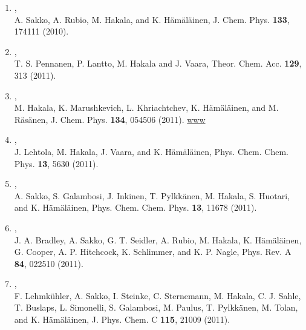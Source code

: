 \documentclass[12pt,a4]{report}
\begin{document}
\begin{enumerate}
\item{},\\ 
A. Sakko, A. Rubio, M. Hakala, and K. H{\"a}m{\"a}l{\"a}inen, J. Chem. Phys. {\bf 133}, 174111 (2010).  

\item{},\\ T. S. Pennanen, P. Lantto, M. Hakala and J. Vaara, Theor. Chem. Acc. {\bf 129}, 313 (2011). 

\item{},\\ M. Hakala, K. Marushkevich, L. Khriachtchev, K. H\"am\"al\"ainen, and M. R\"as\"anen, J. Chem. Phys. {\bf 134}, 054506 (2011). %
\href{http://scitation.aip.org/content/aip/journal/jcp/134/5/10.1063/1.3533955}{www}  


\item{},\\ J. Lehtola, M. Hakala, J. Vaara, and K. H\"am\"al\"ainen, Phys. Chem. Chem. Phys. {\bf 13}, 5630 (2011). %

\item{},\\ A. Sakko, S. Galambosi, J. Inkinen, T. Pylkk\"anen, M. Hakala, S. Huotari, and K. H\"am\"al\"ainen, Phys. Chem. Chem. Phys. {\bf 13}, 11678 (2011). %

\item{},\\ J. A. Bradley, A. Sakko, G. T. Seidler, A. Rubio, M. Hakala, K. H\"am\"al\"ainen, G. Cooper, A. P. Hitchcock, K. Schlimmer, and K. P. Nagle, Phys. Rev. A {\bf 84}, 022510 (2011). %

\item{}, \\F. Lehmk\"uhler, A. Sakko, I. Steinke, C. Sternemann, M.
Hakala, C. J. Sahle, T. Buslaps, L. Simonelli, S. Galambosi, M. Paulus, T. Pylkkänen, M. Tolan, and K. H\"am\"al\"ainen, J. Phys. Chem. C {\bf 115}, 21009 (2011). 


\end{enumerate}
\end{document}
